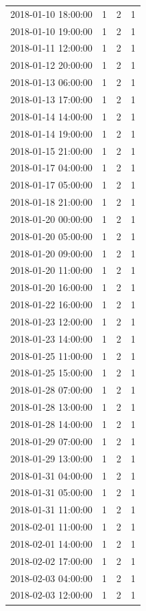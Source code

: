 \begin{tabular}{lrrr}
2018-01-10 18:00:00 & 1 & 2 & 1 \\
2018-01-10 19:00:00 & 1 & 2 & 1 \\
2018-01-11 12:00:00 & 1 & 2 & 1 \\
2018-01-12 20:00:00 & 1 & 2 & 1 \\
2018-01-13 06:00:00 & 1 & 2 & 1 \\
2018-01-13 17:00:00 & 1 & 2 & 1 \\
2018-01-14 14:00:00 & 1 & 2 & 1 \\
2018-01-14 19:00:00 & 1 & 2 & 1 \\
2018-01-15 21:00:00 & 1 & 2 & 1 \\
2018-01-17 04:00:00 & 1 & 2 & 1 \\
2018-01-17 05:00:00 & 1 & 2 & 1 \\
2018-01-18 21:00:00 & 1 & 2 & 1 \\
2018-01-20 00:00:00 & 1 & 2 & 1 \\
2018-01-20 05:00:00 & 1 & 2 & 1 \\
2018-01-20 09:00:00 & 1 & 2 & 1 \\
2018-01-20 11:00:00 & 1 & 2 & 1 \\
2018-01-20 16:00:00 & 1 & 2 & 1 \\
2018-01-22 16:00:00 & 1 & 2 & 1 \\
2018-01-23 12:00:00 & 1 & 2 & 1 \\
2018-01-23 14:00:00 & 1 & 2 & 1 \\
2018-01-25 11:00:00 & 1 & 2 & 1 \\
2018-01-25 15:00:00 & 1 & 2 & 1 \\
2018-01-28 07:00:00 & 1 & 2 & 1 \\
2018-01-28 13:00:00 & 1 & 2 & 1 \\
2018-01-28 14:00:00 & 1 & 2 & 1 \\
2018-01-29 07:00:00 & 1 & 2 & 1 \\
2018-01-29 13:00:00 & 1 & 2 & 1 \\
2018-01-31 04:00:00 & 1 & 2 & 1 \\
2018-01-31 05:00:00 & 1 & 2 & 1 \\
2018-01-31 11:00:00 & 1 & 2 & 1 \\
2018-02-01 11:00:00 & 1 & 2 & 1 \\
2018-02-01 14:00:00 & 1 & 2 & 1 \\
2018-02-02 17:00:00 & 1 & 2 & 1 \\
2018-02-03 04:00:00 & 1 & 2 & 1 \\
2018-02-03 12:00:00 & 1 & 2 & 1 \\

\end{tabular}
